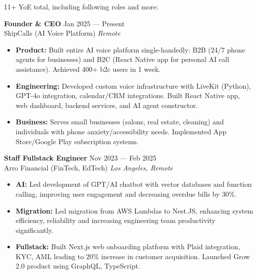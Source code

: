 \documentclass{template}
\begin{document}
\begin{rSection}{11+ YoE total, including following roles and more:}

\textbf{Founder \& CEO} \hfill Jan 2025 --- Present\\
SkipCalls (AI Voice Platform) \hfill \textit{Remote}
\begin{minipage}{0.95\textwidth}
 \begin{itemize}
    \footnotesize
    \vspace{0.1cm}
    \itemsep 1pt {}  
    \item \textbf{Product:} Built entire AI voice platform single-handedly: B2B (24/7 phone agents for businesses) and B2C (React Native app for personal AI call assistance). Achieved 400+ b2c users in 1 week.
    \item \textbf{Engineering:} Developed custom voice infrastructure with LiveKit (Python), GPT-4o integration, calendar/CRM integrations. Built React Native app, web dashboard, backend services, and AI agent constructor.
    \item \textbf{Business:} Serves small businesses (salons, real estate, cleaning) and individuals with phone anxiety/accessibility needs. Implemented App Store/Google Play subscription systems.
 \end{itemize}
\end{minipage}

\textbf{Staff Fullstack Engineer} \hfill Nov 2023 --- Feb 2025\\
Arro Financial (FinTech, EdTech) \hfill \textit{Los Angeles, Remote}
\begin{minipage}{0.95\textwidth}
 \begin{itemize}
    \footnotesize
    \vspace{0.1cm}
    \itemsep 1pt {}  
    \item \textbf{AI:} Led development of GPT/AI chatbot with vector databases and function calling, improving user engagement and decreasing overdue bills by 30\%.
    \item \textbf{Migration:} Led migration from AWS Lambdas to Nest.JS, enhancing system efficiency, reliability and increasing engineering team productivity significantly.
    \item \textbf{Fullstack:} Built Next.js web onboarding platform with Plaid integration, KYC, AML leading to 20\% increase in customer acquisition. Launched Grow 2.0 product using GraphQL, TypeScript.
 \end{itemize}
\end{minipage}


\end{rSection}
\end{document}
